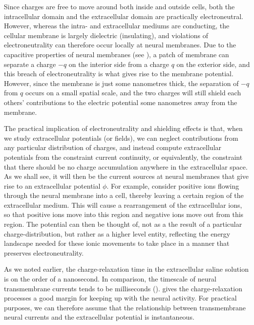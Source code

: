 Since charges are free to move around both inside and outside cells, both the intracellular domain and the extracellular domain are practically electroneutral. However, whereas the intra- and extracellular mediums are conducting, the cellular membrane is largely dielectric (insulating), and violations of electroneutrality can therefore occur locally at neural membranes.
Due to the capacitive properties of neural membranes (see ), a patch of membrane can separate a charge $-q$ on the interior side from a charge $q$ on the exterior side, and this breach of electroneutrality is what gives rise to the membrane potential. However, since the membrane is just some nanometres thick, the separation of $-q$ from $q$ occurs on a small spatial scale, and the two charges will still shield each others' contributions to the electric potential some nanometres away from the membrane. 

The practical implication of electroneutrality and shielding effects is that, when we study extracellular potentials (or fields), we can neglect contributions from any particular distribution of charges, and instead compute extracellular potentials from the constraint  current continuity, or equivalently, the constraint that  there should be no charge accumulation anywhere in the extracellular space. As we shall see, it will then be the current sources at neural membranes that give rise to an extracellular potential $\phi$. For example, consider positive ions flowing through the neural membrane into a cell, thereby leaving a certain region of the extracellular medium. This will cause a rearrangement of the extracellular ions, so that positive ions move into this region and negative ions move out from this region. The potential can then be thought of, not as a the result of a particular charge-distribution, but rather as a higher level entity, reflecting the energy landscape needed for these ionic movements to take place in a manner that preserves electroneutrality. 

As we noted earlier, the charge-relaxation time in the extracellular saline solution is on the order of a nanosecond. In comparison, the timescale of neural transmembrane currents tends to be milliseconds ().  gives the charge-relaxation processes a good margin for keeping up with the neural activity. For practical purposes, we can therefore assume that the relationship between transmembrane neural currents and the extracellular potential is instantaneous.



